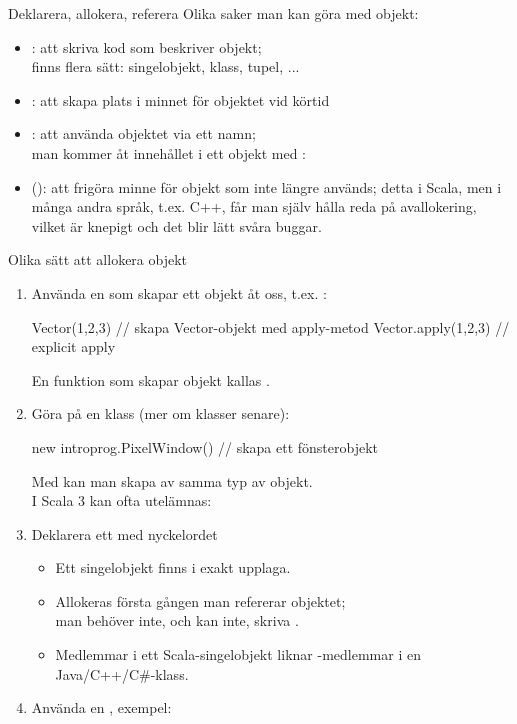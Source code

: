\begin{Slide}{Deklarera, allokera, referera}
Olika saker man kan göra med objekt:
\begin{itemize}
  \item {}: att skriva kod som beskriver objekt; \\
  finns flera sätt: singelobjekt, klass, tupel, ...
  \item {}: att skapa plats i minnet för objektet vid körtid
  \item {}: att använda objektet via ett namn;\\
  man kommer åt innehållet i ett objekt med : \\
  \pause
  \item (): att frigöra minne för objekt som inte längre används;
  detta  i Scala, men i många andra språk,
  t.ex. C++, får man själv hålla reda på avallokering,
  vilket är knepigt och det blir lätt svåra buggar.
\end{itemize}
\end{Slide}


\begin{Slide}{Olika sätt att allokera objekt}\SlideFontSmall
\begin{enumerate}

\item Använda en  som skapar ett objekt åt oss, t.ex. :
\begin{Code}
Vector(1,2,3)  // skapa Vector-objekt med apply-metod
Vector.apply(1,2,3)  // explicit apply
\end{Code}
{\SlideFontTiny En funktion som skapar objekt kallas  .\vspace{0.5em}}

\item Göra  på en klass (mer om klasser senare):
\begin{Code}
new introprog.PixelWindow() // skapa ett fönsterobjekt
\end{Code}
{
\SlideFontSmall Med  kan man skapa  av samma typ av objekt.\\
I Scala 3 kan  ofta utelämnas: 
}

\item Deklarera ett  med nyckelordet 
\begin{itemize}\SlideFontSmall
  \item Ett singelobjekt finns i exakt  upplaga.
  \item Allokeras  första gången man refererar objektet; \\
  man behöver inte, och kan inte, skriva .
  \pause
  \item Medlemmar i ett Scala-singelobjekt liknar -medlemmar i en Java/C++/C\#-klass.
\end{itemize}
\item Använda en , exempel: 
\end{enumerate}
\end{Slide}


